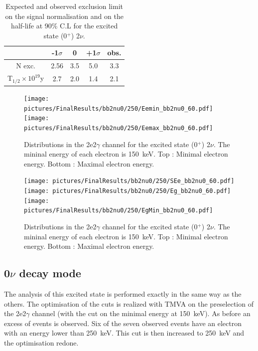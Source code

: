 \documentclass[main.tex]{subfiles}
\begin{document}
\begin{table}
\centering
\begin{tabular}{c|c|c|c||c}
                                                & -1$\sigma$ & 0        & +1$\sigma$ & obs.     \\[0.2cm]
\hline
N exc.                                          & 2.56       & 3.5      & 5.0          & 3.3     \\[0.2cm]
T$_{\text{1/2}} \times \text{10}^{\text{19}}$y  & 2.7        & 2.0      & 1.4          & 2.1      \\[0.2cm]
\hline 
\end{tabular}
\caption{Expected and observed exclusion limit on the signal normalisation and on the half-life at 90\% C.L for the excited state (0$^+$) 2$\nu$.}
\label{Tab:FinalResultsbb2nu0}
\end{table}


\begin{figure} [h!]
\begin{center}
\texttt{[image: pictures/FinalResults/bb2nu0/250/Eemin\_bb2nu0\_60.pdf]}
\texttt{[image: pictures/FinalResults/bb2nu0/250/Eemax\_bb2nu0\_60.pdf]}
\end{center}
\caption{Distributions in the 2e2$\gamma$ channel for the excited state (0$^+$) 2$\nu$. The mininal energy of each electron is 150~keV. Top : Minimal electron energy. Bottom : Maximal electron energy.}
\label{plot:EeminAndEemax250bb2nu0_250}
\end{figure}


\begin{figure} [h!]
\begin{center}
\texttt{[image: pictures/FinalResults/bb2nu0/250/SEe\_bb2nu0\_60.pdf]}
\texttt{[image: pictures/FinalResults/bb2nu0/250/Eg\_bb2nu0\_60.pdf]}
\texttt{[image: pictures/FinalResults/bb2nu0/250/EgMin\_bb2nu0\_60.pdf]}
\end{center}
\caption{Distributions in the 2e2$\gamma$ channel for the excited state (0$^+$) 2$\nu$. The mininal energy of each electron is 150~keV. Top : Minimal electron energy. Bottom : Maximal electron energy.}
\label{plot:SEeAndEg250bb2nu0_250}
\end{figure}


\FloatBarrier


\subsection{0$\nu$ decay mode}\label{Analysisbb0nu0}


\NI The analysis of this excited state is performed exactly in the same way as the others. The optimisation of the cuts is realized with TMVA on the preselection of the 2e2$\gamma$ channel (with the cut on the minimal energy at 150~keV). As before an excess of events is observed. Six of the seven observed events have an electron with an energy lower than 250~keV. This cut is then increased to 250~keV and the optimisation redone.
\end{document}
